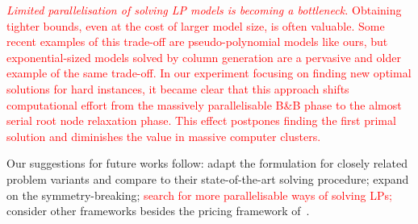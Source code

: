 \documentclass[smallextended]{svjour3}       %
\newif\iffinalversion
\newcommand{\oldtext}[1]{\iffinalversion%
\else%
\textcolor{red}{#1}%
\fi%
}
\begin{document}
\oldtext{
\emph{Limited parallelisation of solving LP models is becoming a bottleneck.}
Obtaining tighter bounds, even at the cost of larger model size, is often valuable.
Some recent examples of this trade-off are pseudo-polynomial models like ours, but exponential-sized models solved by column generation are a pervasive and older example of the same trade-off.
In our experiment focusing on finding new optimal solutions for hard instances, it became clear that this approach shifts computational effort from the massively parallelisable B\&B phase to the almost serial root node relaxation phase.
This effect postpones finding the first primal solution and diminishes the value in massive computer clusters.
}

Our suggestions for future works follow: adapt the formulation for closely related problem variants and compare to their state-of-the-art solving procedure; expand on the symmetry-breaking; \oldtext{search for more parallelisable ways of solving LPs;} consider other frameworks besides the pricing framework of~\cite{furini:2016}.


%
%
%
\end{document}
